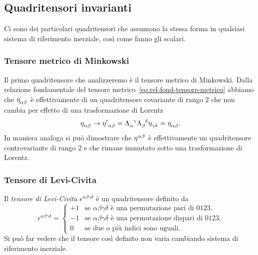 \subsection{Quadritensori invarianti}
\label{sec:tensori-invarianti}

Ci sono dei particolari quadritensori che assumono la stessa forma in qualsiasi
sistema di riferimento inerziale, così come fanno gli scalari.

\subsubsection{Tensore metrico di Minkowski}
\label{sec:tensore-metrico}

Il primo quadritensore che analizzeremo è il tensore metrico di Minkowski.
Dalla relazione fondamentale del tensore
metrico~\eqref{eq:rel-fond-tensore-metrico} abbiamo che
$\tensor{\eta}{_{\alpha\beta}}$ è effettivamente di un quadritensore covariante
di rango $2$ che non cambia per effetto di una trasformazione di Lorentz
\begin{equation}
  \tensor{\eta}{_{\alpha\beta}} \to \tensor{{\eta'}}{_{\alpha\beta}} =
  \tensor{\Lambda}{_{\alpha}^{\gamma}} \tensor{\Lambda}{_{\beta}^{\delta}}
  \tensor{\eta}{_{\gamma\delta}} = \tensor{\eta}{_{\alpha\beta}}.
\end{equation}
In maniera analoga si può dimostrare che $\tensor{\eta}{^{\alpha\beta}}$ è
effettivamente un quadritensore controvariante di rango $2$ e che rimane
immutato sotto una trasformazione di Lorentz.

\subsubsection{Tensore di Levi-Civita}
\label{sec:tensore-levi-civita}

Il \emph{tensore di Levi-Civita}
$\epsilon^{\alpha\beta\gamma\delta}$ è un quadritensore definito da
\begin{equation}
  \epsilon^{\alpha\beta\gamma\delta} =
  \begin{cases}
    +1 & \text{se $\alpha\beta\gamma\delta$ è una permutazione pari di $0123$,}
    \\
    -1 & \text{se $\alpha\beta\gamma\delta$ è una permutazione dispari di
      $0123$,} \\
    0 & \text{se due o più indici sono uguali.}
  \end{cases}
\end{equation}
Si può far vedere che il tensore così definito non varia cambiando sistema di
riferimento inerziale.

